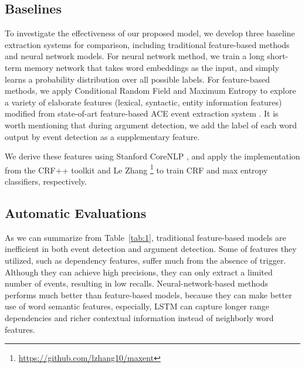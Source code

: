 \documentclass{article}
\begin{document}
\subsection{Baselines}
To investigate the effectiveness of our proposed model, we develop three baseline extraction systems for comparison, including traditional feature-based methods and neural network models. For neural network method, we train a long short-term memory network that takes word embeddings as the input, and simply learns a probability distribution over all possible labels. For feature-based methods, we apply Conditional Random Field \cite{lafferty2001conditional} and Maximum Entropy \cite{berger1996maximum} to explore a variety of elaborate features (lexical, syntactic, entity information features) modified from state-of-art feature-based ACE event extraction system \cite{li2013joint}. It is worth mentioning that during argument detection, we add the label of each word output by event detection as a supplementary feature.

We derive these features using Stanford CoreNLP \cite{manning2014stanford}, and apply the implementation from the CRF++ toolkit \cite{kudo2005crf++} and Le Zhang \footnote{\url{https://github.com/lzhang10/maxent}} to train CRF and max entropy classifiers, respectively.

\subsection{Automatic Evaluations}
As we can summarize from Table~\ref{tab:1}, traditional feature-based models are inefficient in both event detection and argument detection. Some of features they utilized, such as dependency features, suffer much from the absence of trigger. Although they can achieve high precisions, they can only extract a limited number of events, resulting in low recalls. Neural-network-based methods performs much better than feature-based models, because they can make better use of word semantic features, especially, LSTM can capture longer range dependencies and richer contextual information instead of neighborly word features.
\end{document}
